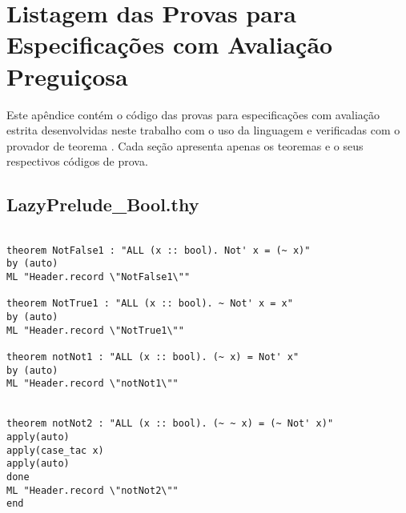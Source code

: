 \chapter{Listagem das Provas para Especificações com Avaliação Preguiçosa}
\label{appendix:lazyProofs}
Este apêndice contém o código das provas para especificações com avaliação estrita desenvolvidas neste trabalho com o uso da linguagem \HOL e verificadas com o provador de teorema \Isabelle.
Cada seção apresenta apenas os teoremas e o seus respectivos códigos de prova.

\section{LazyPrelude\_Bool.thy}
\label{appendix:lazyProofs:Bool}
\begin{multicols}{2}
\tiny
\begin{Verbatim}

theorem NotFalse1 : "ALL (x :: bool). Not' x = (~ x)"
by (auto)
ML "Header.record \"NotFalse1\""

theorem NotTrue1 : "ALL (x :: bool). ~ Not' x = x"
by (auto)
ML "Header.record \"NotTrue1\""

theorem notNot1 : "ALL (x :: bool). (~ x) = Not' x"
by (auto)
ML "Header.record \"notNot1\""


theorem notNot2 : "ALL (x :: bool). (~ ~ x) = (~ Not' x)"
apply(auto)
apply(case_tac x)
apply(auto)
done
ML "Header.record \"notNot2\""
end
\end{Verbatim}
\end{multicols}


